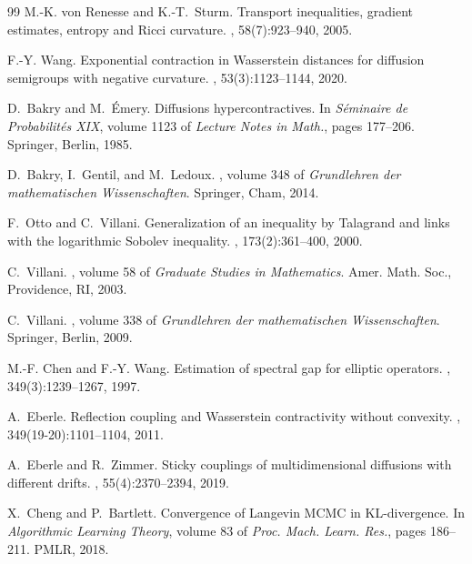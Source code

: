 \documentclass[11pt]{article}
\theoremstyle{definition}
\begin{document}
\begin{thebibliography}{99}
M.-K. von Renesse and K.-T.~Sturm.
\newblock Transport inequalities, gradient estimates, entropy and {R}icci curvature.
, 58(7):923--940, 2005.

F.-Y. Wang.
\newblock Exponential contraction in {W}asserstein distances for diffusion semigroups with negative curvature.
, 53(3):1123--1144, 2020.

D.~Bakry and M.~\'Emery.
\newblock Diffusions hypercontractives.
\newblock In {\em S\'eminaire de Probabilit\'es XIX}, volume 1123 of {\em Lecture Notes in Math.}, pages 177--206. Springer, Berlin, 1985.

D.~Bakry, I.~Gentil, and M.~Ledoux.
, volume 348 of {\em Grundlehren der mathematischen Wissenschaften}.
\newblock Springer, Cham, 2014.

F.~Otto and C.~Villani.
\newblock Generalization of an inequality by {T}alagrand and links with the logarithmic {S}obolev inequality.
, 173(2):361--400, 2000.

C.~Villani.
, volume 58 of {\em Graduate Studies in Mathematics}.
\newblock Amer. Math. Soc., Providence, RI, 2003.

C.~Villani.
, volume 338 of {\em Grundlehren der mathematischen Wissenschaften}.
\newblock Springer, Berlin, 2009.

M.-F. Chen and F.-Y. Wang.
\newblock Estimation of spectral gap for elliptic operators.
, 349(3):1239--1267, 1997.

A.~Eberle.
\newblock Reflection coupling and {W}asserstein contractivity without convexity.
, 349(19-20):1101--1104, 2011.

A.~Eberle and R.~Zimmer.
\newblock Sticky couplings of multidimensional diffusions with different drifts.
, 55(4):2370--2394, 2019.

X.~Cheng and P.~Bartlett.
\newblock Convergence of {L}angevin {MCMC} in {KL}-divergence.
\newblock In {\em Algorithmic Learning Theory}, volume 83 of {\em Proc. Mach. Learn. Res.}, pages 186--211. PMLR, 2018.


\end{thebibliography}
\end{document}
